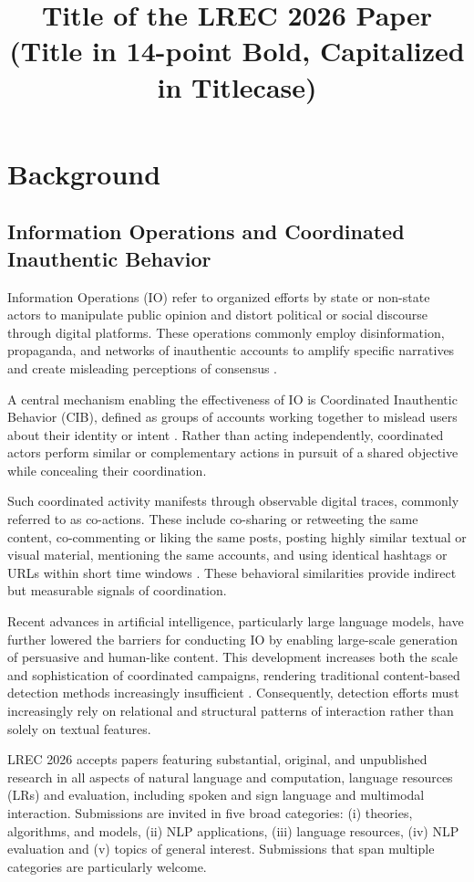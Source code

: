 \documentclass[10pt, a4paper]{article}
\title{Title of the LREC 2026 Paper (Title in 14-point Bold, Capitalized in Titlecase)}
\begin{document}
\maketitleabstract

\section{Background}
\subsection{Information Operations and Coordinated Inauthentic Behavior}

Information Operations (IO) refer to organized efforts by state or non-state actors to manipulate public opinion and distort political or social discourse through digital platforms. These operations commonly employ disinformation, propaganda, and networks of inauthentic accounts to amplify specific narratives and create misleading perceptions of consensus \cite{weedon2017information}. 

A central mechanism enabling the effectiveness of IO is Coordinated Inauthentic Behavior (CIB), defined as groups of accounts working together to mislead users about their identity or intent \cite{gleicher2018coordinated, mannocci2024detection}. Rather than acting independently, coordinated actors perform similar or complementary actions in pursuit of a shared objective while concealing their coordination.

Such coordinated activity manifests through observable digital traces, commonly referred to as co-actions. These include co-sharing or retweeting the same content, co-commenting or liking the same posts, posting highly similar textual or visual material, mentioning the same accounts, and using identical hashtags or URLs within short time windows \cite{luceri2024unmasking, mannocci2024detection}. These behavioral similarities provide indirect but measurable signals of coordination.


Recent advances in artificial intelligence, particularly large language models, have further lowered the barriers for conducting IO by enabling large-scale generation of persuasive and human-like content. This development increases both the scale and sophistication of coordinated campaigns, rendering traditional content-based detection methods increasingly insufficient \cite{fredheim2024assessing}. Consequently, detection efforts must increasingly rely on relational and structural patterns of interaction rather than solely on textual features.





LREC 2026 accepts papers featuring substantial, original, and unpublished research in all aspects of natural language and computation, language resources (LRs) and evaluation, including spoken and sign language and multimodal interaction. Submissions are invited in five broad categories: (i) theories, algorithms, and models, (ii) NLP applications, (iii) language resources, (iv) NLP evaluation and (v) topics of general interest. Submissions that span multiple categories are particularly welcome.   
\end{document}
